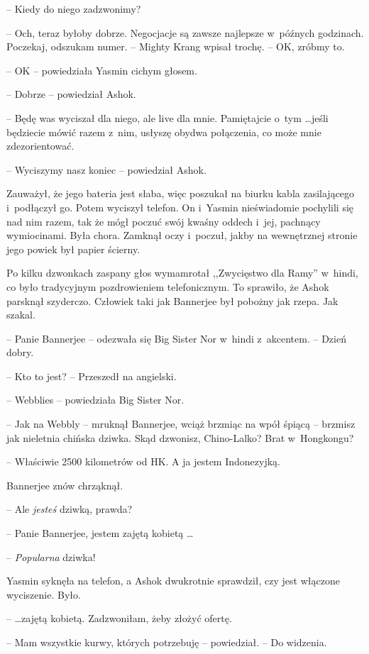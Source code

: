 \documentclass[oneside,polish,11pt,rmheadings]{mwbk}
\begin{document}
-- Kiedy do niego zadzwonimy?

-- Och, teraz byłoby dobrze. Negocjacje są zawsze najlepsze w~późnych godzinach. Poczekaj, odszukam numer. -- Mighty Krang wpisał trochę. -- OK, zróbmy to. 

-- OK -- powiedziała Yasmin cichym głosem.

-- Dobrze -- powiedział Ashok.

-- Będę was wyciszał dla niego, ale live dla mnie. Pamiętajcie o~tym \ldots  jeśli będziecie mówić razem z~nim, usłyszę obydwa połączenia, co może mnie zdezorientować.

-- Wyciszymy nasz koniec -- powiedział Ashok. 

Zauważył, że jego bateria jest słaba, więc poszukał na biurku kabla zasilającego i~podłączył go. Potem wyciszył telefon. On i~Yasmin nieświadomie pochylili się nad nim razem, tak że mógł poczuć swój kwaśny oddech i~jej, pachnący wymiocinami. Była chora. Zamknął oczy i~poczuł, jakby na wewnętrznej stronie jego powiek był papier ścierny.

Po kilku dzwonkach zaspany głos wymamrotał ,,Zwycięstwo dla Ramy'' w~hindi, co było tradycyjnym pozdrowieniem telefonicznym. To sprawiło, że Ashok parsknął szyderczo. Człowiek taki jak Bannerjee był pobożny jak rzepa. Jak szakal.

-- Panie Bannerjee -- odezwała się Big Sister Nor w~hindi z~akcentem. -- Dzień dobry. 

-- Kto to jest? -- Przeszedł na angielski.

-- Webblies -- powiedziała Big Sister Nor.

-- Jak na Webbly -- mruknął Bannerjee, wciąż brzmiąc na wpół śpiącą -- brzmisz jak nieletnia chińska dziwka. Skąd dzwonisz, Chino-Lalko? Brat w~Hongkongu?

-- Właściwie 2500 kilometrów od HK. A ja jestem Indonezyjką.

Bannerjee znów chrząknął. 

-- Ale \textit{jesteś }dziwką, prawda?

-- Panie Bannerjee, jestem zajętą kobietą \ldots 

-- \textit{Popularna }dziwka! 

Yasmin syknęła na telefon, a Ashok dwukrotnie sprawdził, czy jest włączone wyciszenie. Było.

--  \ldots  zajętą kobietą. Zadzwoniłam, żeby złożyć ofertę. 

-- Mam wszystkie kurwy, których potrzebuję -- powiedział. -- Do widzenia. 
\end{document}
